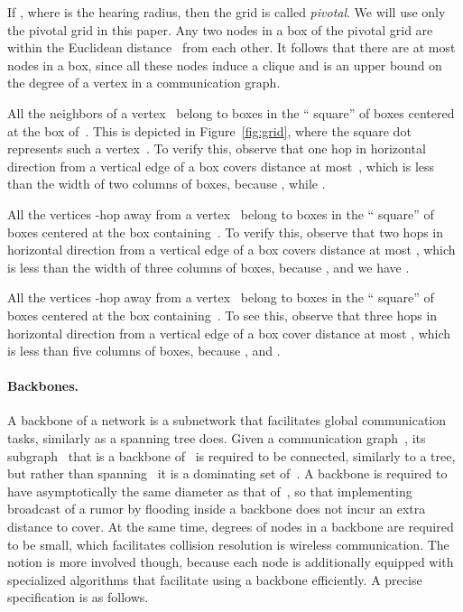 \documentclass[11pt]{article}
\newcommand{\BBB}{\vspace*{-\bigskipamount}}
\newcommand{\Paragraph}[1]{\BBB\paragraph{#1}}
\begin{document}
If , where  is the hearing radius, then the grid is called \emph{pivotal}.
We will use only the pivotal grid in this paper.
Any two nodes in a box of the pivotal grid are within the Euclidean distance~ from each other.
It follows that there are at most  nodes in a box, since all these nodes induce a clique and  is an upper bound on the degree of a vertex in a communication graph.

All the neighbors of a vertex~ belong to  boxes in the `` square'' of boxes centered at the box of~.
This is depicted in Figure~\ref{fig:grid}, where the square dot represents such a vertex~.
To verify this, observe that one hop in horizontal direction from a vertical edge of a box covers distance at most~, which is less than the width of two columns of boxes, because , while .

All the vertices -hop away from a vertex~ belong to  boxes in the `` square'' of boxes centered at the box containing~.
To verify this, observe that two hops in horizontal direction from a vertical edge of a box covers distance at most , which is less than the width of three columns of boxes, because , and we have .

All the vertices -hop away from a vertex~ belong to  boxes in the `` square'' of boxes centered at the box containing~.
To see this, observe that three hops in horizontal direction from a vertical edge of a box cover distance at most , which is less than five columns of boxes, because , and .


\Paragraph{Backbones.} 



A backbone of a network is a subnetwork that facilitates global communication tasks, similarly as a spanning tree does.
Given a communication graph~, its subgraph~ that is a backbone of~ is required to be connected, similarly to a tree, but rather than  spanning~ it is a dominating set of~.
A backbone is required to have asymptotically the same diameter as that of~, so that implementing broadcast of a rumor by flooding inside a backbone does not incur an extra distance to cover.
At the same time, degrees of nodes in a backbone are required to be small, which facilitates collision resolution is wireless communication.
The notion is more involved though, because each node is additionally equipped with specialized algorithms that facilitate using a backbone efficiently. 
A precise specification is as follows.
\end{document}
